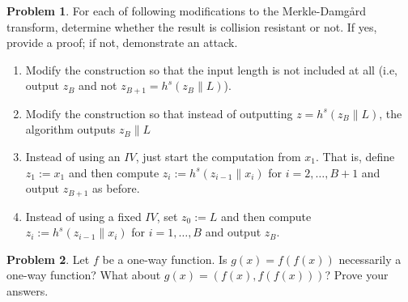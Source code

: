 \documentclass[11pt]{article}
\theoremstyle{definition}
\providecommand{\abs}[1]{\lvert#1\rvert}
\newtheorem{problem}{Problem}
\begin{document}
\begin{problem}
For each of following modifications to the Merkle-Damg\r{a}rd transform, determine whether the result is collision resistant or not. If yes, provide a proof; if not, demonstrate an attack.
\begin{enumerate}
\item Modify the construction so that the input length is not included at all (i.e, output $z_B$ and not $z_{B+1} = h^s(z_B\| L)$).
\item Modify the construction so that instead of outputting $z = h^s(z_B\| L)$, the algorithm outputs $z_B\|L$
\item Instead of using an $IV$, just start the computation from $x_1$. That is, define $z_1 := x_1$ and then compute $z_i := h^s(z_{i-1}\|x_i)$ for $i=2,\dotsc,B+1$ and output $z_{B+1}$ as before.
\item Instead of using a fixed $IV$, set $z_0 := L$ and then compute $z_i := h^s(z_{i-1}\|x_i)$ for $i=1,\dotsc,B$ and output $z_B$.
\end{enumerate}
\end{problem}


\begin{problem}
Let $f$ be a one-way function. Is $g(x) = f(f(x))$ necessarily a one-way function? What about $g(x) = (f(x),f(f(x)))$? Prove your answers.
\end{problem}
\end{document}
